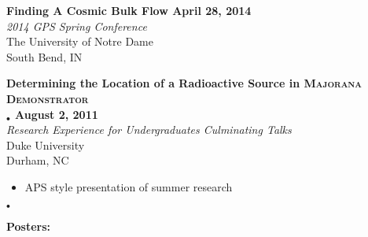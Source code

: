 \documentclass[margin]{res}
\begin{document}
\begin{resume}
{\bf Finding A Cosmic Bulk Flow \hfill April 28, 2014} \\
{\sl 2014 GPS Spring Conference} \\
The University of Notre Dame \\
South Bend, IN




{\bf Determining the Location of a Radioactive Source in \textsc{Majorana Demonstrator} \\
$_{•}    $  \hfill August 2, 2011} \\
{\sl Research Experience for Undergraduates Culminating Talks}  \\
Duke University \\
Durham, NC
\begin{itemize}\itemsep -2pt
     \item APS style presentation of summer research
\end{itemize}




 $_{•}    $\\
\centerline{\bf Posters:}


\end{resume}
\end{document}
